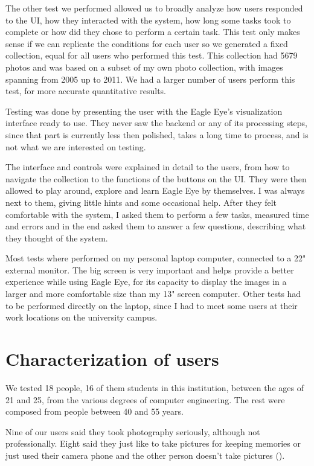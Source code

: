 The other test we performed allowed us to broadly analyze how users responded to the \ac{UI}, how they interacted with the system, how long some tasks took to complete or how did they chose to perform a certain task. This test only makes sense if we can replicate the conditions for each user so we generated a fixed collection, equal for all users who performed this test. This collection had 5679 photos and was based on a subset of my own photo collection, with images spanning from 2005 up to 2011. We had a larger number of users perform this test, for more accurate quantitative results.

Testing was done by presenting the user with the Eagle Eye's visualization interface ready to use. They never saw the backend or any of its processing steps, since that part is currently less then polished, takes a long time to process, and is not what we are interested on testing.

The interface and controls were explained in detail to the users, from how to navigate the collection to the functions of the buttons on the \ac{UI}. They were then allowed to play around, explore and learn Eagle Eye by themselves. I was always next to them, giving little hints and some occasional help. After they felt comfortable with the system, I asked them to perform a few tasks, measured time and errors and in the end asked them to answer a few questions, describing what they thought of the system.

Most tests where performed on my personal laptop computer, connected to a 22" external monitor. The big screen is very important and helps provide a better experience while using Eagle Eye, for its capacity to display the images in a larger and more comfortable size than my 13" screen computer. Other tests had to be performed directly on the laptop, since I had to meet some users at their work locations on the university campus.





\section{Characterization of users}

We tested 18 people, 16 of them students in this institution, between the ages of 21 and 25, from the various degrees of computer engineering. The rest were composed from people between 40 and 55 years.

Nine of our users said they took photography seriously, although not professionally. Eight said they just like to take pictures for keeping memories or just used their camera phone and the other person doesn't take pictures ().


